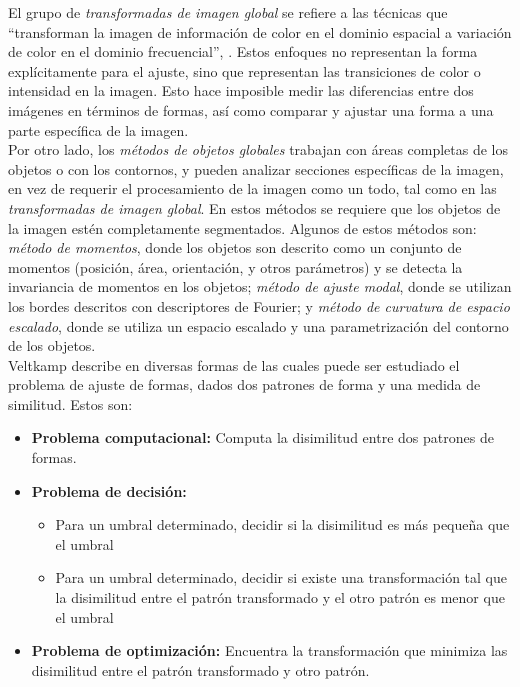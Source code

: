 El grupo de \emph{transformadas de imagen global} se refiere a las 
t\'ecnicas que ``transforman la imagen de informaci\'on de color en
el dominio espacial a variaci\'on de color en el dominio frecuencial'', 
\cite{matchingbook}. Estos enfoques no representan la forma expl\'icitamente 
para el ajuste,
sino que representan las transiciones de color o intensidad en
la imagen. Esto hace imposible medir las diferencias entre dos
im\'agenes en t\'erminos de formas, as\'i como comparar y ajustar
una forma a una parte espec\'ifica de la imagen.\\
Por otro lado, los \emph{m\'etodos de objetos globales} trabajan 
con \'areas completas de los objetos o con los contornos, y pueden
analizar secciones espec\'ificas de la imagen, en vez de requerir
el procesamiento de la imagen como un todo, tal como en las 
\emph{transformadas de imagen global}. En estos m\'etodos se requiere
que los objetos de la imagen est\'en completamente segmentados. Algunos
de estos m\'etodos son: \emph{m\'etodo de momentos}, donde los
objetos son descrito como un conjunto de momentos (posici\'on, \'area,
orientaci\'on, y otros par\'ametros) y se detecta la invariancia de 
momentos en los objetos; \emph{m\'etodo de ajuste modal}, donde 
se utilizan los bordes descritos con descriptores de Fourier; y
\emph{m\'etodo de curvatura de espacio escalado}, donde se utiliza 
un espacio escalado y una parametrizaci\'on del contorno de los objetos.\\

Veltkamp describe en \cite{matching2} diversas formas de las cuales
puede ser estudiado el problema de ajuste de formas, dados
dos patrones de forma y una medida de similitud. Estos son:


\begin{itemize}
\item \textbf{Problema computacional:} Computa la disimilitud entre
dos patrones de formas.
\item \textbf{Problema de decisi\'on: }
  \begin{itemize}
  \item  Para un umbral determinado, decidir si la disimilitud es 
    m\'as peque\~na que el umbral
  \item Para un umbral determinado, decidir si existe una transformaci\'on
    tal que la disimilitud entre el patr\'on transformado y el otro
    patr\'on es menor que el umbral
  \end{itemize}
 
\item \textbf{Problema de optimizaci\'on: } Encuentra la transformaci\'on
que minimiza las disimilitud entre el patr\'on transformado y otro patr\'on.
\end{itemize}

